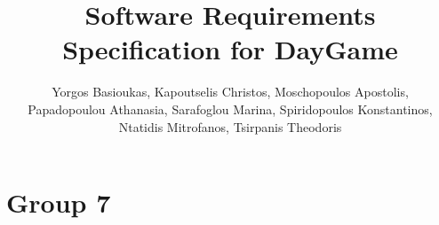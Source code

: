 \documentclass[12pt]{report}
\title{Software Requirements Specification for DayGame}
\author{Yorgos Basioukas, Kapoutselis Christos, Moschopoulos Apostolis, \\
Papadopoulou Athanasia, Sarafoglou Marina, Spiridopoulos Konstantinos, \\
Ntatidis Mitrofanos, Tsirpanis Theodoris}
\date{}
\renewcommand{\_}{\kern-1.5pt\textunderscore\kern-1.5pt}
\begin{document}
\maketitle
\setlength{\parskip}{2.04pt}
\par

\chapter{Group 7}\par


\vspace{\baselineskip}

\vspace{\baselineskip}

\vspace{\baselineskip}

\vspace{\baselineskip}

\vspace{\baselineskip}

\vspace{\baselineskip}

\vspace{\baselineskip}

\vspace{\baselineskip}

\vspace{\baselineskip}

\vspace{\baselineskip}

\vspace{\baselineskip}


\end{document}
